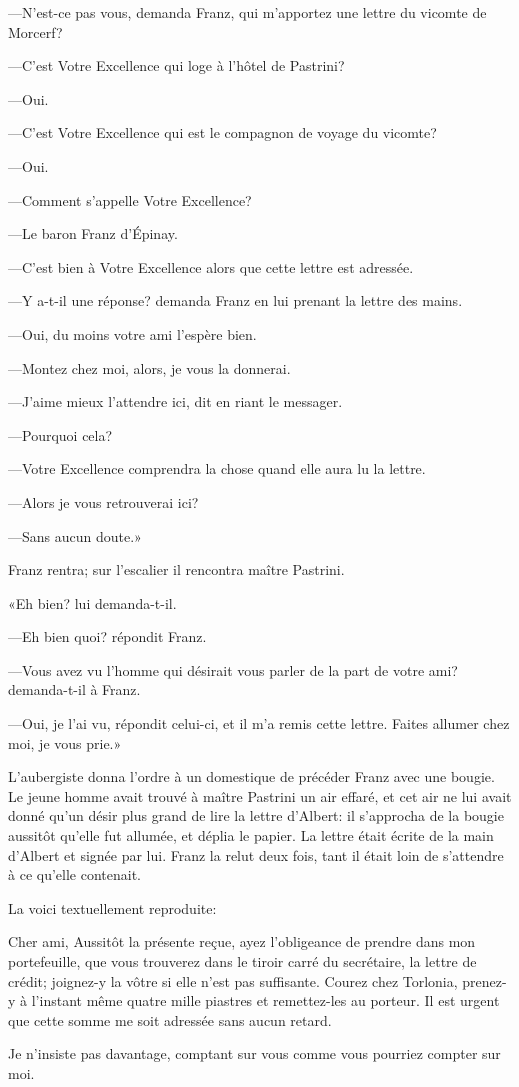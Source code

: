 —N'est-ce pas vous, demanda Franz, qui m'apportez une lettre du vicomte de Morcerf?  

—C'est Votre Excellence qui loge à l'hôtel de Pastrini? 

—Oui. 

—C'est Votre Excellence qui est le compagnon de voyage du vicomte? 

—Oui. 

—Comment s'appelle Votre Excellence? 

—Le baron Franz d'Épinay. 

—C'est bien à Votre Excellence alors que cette lettre est adressée. 

—Y a-t-il une réponse? demanda Franz en lui prenant la lettre des mains. 

—Oui, du moins votre ami l'espère bien. 

—Montez chez moi, alors, je vous la donnerai. 

—J'aime mieux l'attendre ici, dit en riant le messager. 

—Pourquoi cela? 

—Votre Excellence comprendra la chose quand elle aura lu la lettre. 

—Alors je vous retrouverai ici? 

—Sans aucun doute.» 

Franz rentra; sur l'escalier il rencontra maître Pastrini. 

«Eh bien? lui demanda-t-il. 

—Eh bien quoi? répondit Franz. 

—Vous avez vu l'homme qui désirait vous parler de la part de votre ami? demanda-t-il à Franz. 

—Oui, je l'ai vu, répondit celui-ci, et il m'a remis cette lettre. Faites allumer chez moi, je vous prie.» 

L'aubergiste donna l'ordre à un domestique de précéder Franz avec une bougie. Le jeune homme avait trouvé à maître Pastrini un air effaré, et cet air ne lui avait donné qu'un désir plus grand de lire la lettre d'Albert: il s'approcha de la bougie aussitôt qu'elle fut allumée, et déplia le papier. La lettre était écrite de la main d'Albert et signée par lui. Franz la relut deux fois, tant il était loin de s'attendre à ce qu'elle contenait. 

La voici textuellement reproduite: 

\begin{mail}{}{Cher ami,}
Aussitôt la présente reçue, ayez l'obligeance de prendre dans mon portefeuille, que vous trouverez dans le tiroir carré du secrétaire, la lettre de crédit; joignez-y la vôtre si elle n'est pas suffisante. Courez chez Torlonia, prenez-y à l'instant même quatre mille piastres et remettez-les au porteur. Il est urgent que cette somme me soit adressée sans aucun retard. 

Je n'insiste pas davantage, comptant sur vous comme vous pourriez compter sur moi. 


\end{mail}

